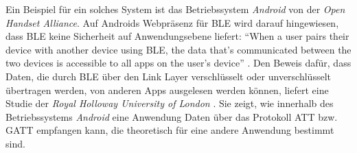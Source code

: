 Ein Beispiel für ein solches System ist das Betriebssystem \textit{Android} von der \textit{Open Handset Alliance}. Auf Androids Webpräsenz für BLE wird darauf hingewiesen, dass BLE keine Sicherheit auf Anwendungsebene liefert: "`When a user pairs their device with another device using BLE, the data that's communicated between the two devices is accessible to all apps on the user's device"' \cite{AndroidAppLayerSec}. 
Den Beweis dafür, dass Daten, die durch BLE über den Link Layer verschlüsselt oder unverschlüsselt übertragen werden, von anderen Apps ausgelesen werden können, liefert eine Studie der \textit{Royal Holloway University of London} \cite{RoyalHollowayUniversity}. Sie zeigt, wie innerhalb des Betriebssystems \textit{Android} eine Anwendung Daten über das Protokoll ATT bzw. GATT empfangen kann, die theoretisch für eine andere Anwendung bestimmt sind.


